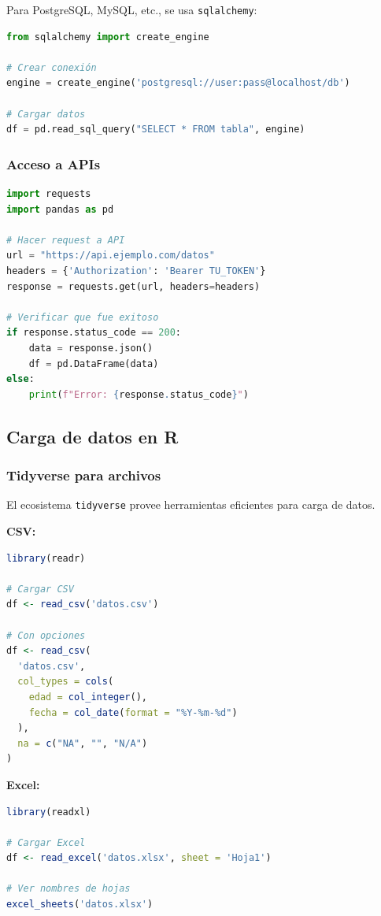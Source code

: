 \documentclass[a4paper,11pt]{article}
\begin{document}
Para PostgreSQL, MySQL, etc., se usa \texttt{sqlalchemy}:

\begin{lstlisting}[language=Python]
from sqlalchemy import create_engine

# Crear conexión
engine = create_engine('postgresql://user:pass@localhost/db')

# Cargar datos
df = pd.read_sql_query("SELECT * FROM tabla", engine)
\end{lstlisting}

\subsubsection{Acceso a APIs}

\begin{lstlisting}[language=Python]
import requests
import pandas as pd

# Hacer request a API
url = "https://api.ejemplo.com/datos"
headers = {'Authorization': 'Bearer TU_TOKEN'}
response = requests.get(url, headers=headers)

# Verificar que fue exitoso
if response.status_code == 200:
    data = response.json()
    df = pd.DataFrame(data)
else:
    print(f"Error: {response.status_code}")
\end{lstlisting}

\subsection{Carga de datos en R}

\subsubsection{Tidyverse para archivos}

El ecosistema \texttt{tidyverse} provee herramientas eficientes para carga de datos.

\textbf{CSV:}
\begin{lstlisting}[language=R]
library(readr)

# Cargar CSV
df <- read_csv('datos.csv')

# Con opciones
df <- read_csv(
  'datos.csv',
  col_types = cols(
    edad = col_integer(),
    fecha = col_date(format = "%Y-%m-%d")
  ),
  na = c("NA", "", "N/A")
)
\end{lstlisting}

\textbf{Excel:}
\begin{lstlisting}[language=R]
library(readxl)

# Cargar Excel
df <- read_excel('datos.xlsx', sheet = 'Hoja1')

# Ver nombres de hojas
excel_sheets('datos.xlsx')
\end{lstlisting}
\end{document}
